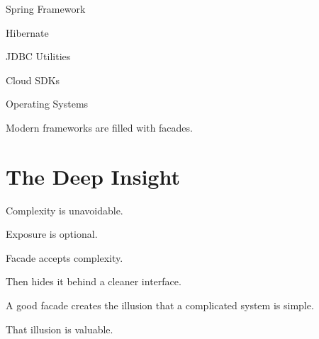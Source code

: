 \documentclass[11pt,a4paper]{book}
\begin{document}
Spring Framework


Hibernate


JDBC Utilities


Cloud SDKs


Operating Systems


Modern frameworks are filled
with facades.


\section{The Deep Insight}

Complexity is unavoidable.


Exposure is optional.


Facade accepts complexity.


Then hides it behind a cleaner
interface.


\begin{idea}

A good facade creates the
illusion that a complicated
system is simple.


That illusion is valuable.

\end{idea}


\end{document}

